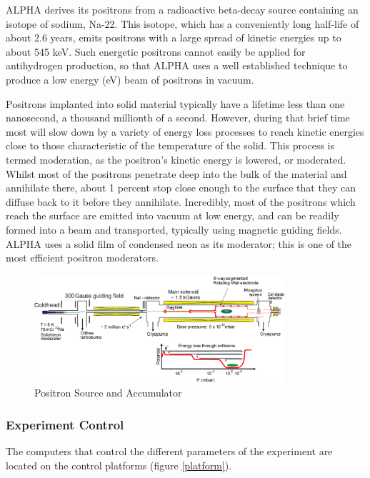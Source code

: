 \documentclass[12pt,a4paper]{article}
\begin{document}
ALPHA derives its positrons from a radioactive beta-decay source containing an isotope of sodium, Na-22. This isotope, which has a conveniently long half-life of about 2.6 years, emits positrons with a large spread of kinetic energies up to about 545 keV. Such energetic positrons cannot easily be applied for antihydrogen production, so that ALPHA uses a well established technique to produce a low energy (eV) beam of positrons in vacuum.

Positrons implanted into solid material typically have a lifetime less than one nanosecond, a thousand millionth of a second. However, during that brief time most will slow down by a variety of energy loss processes to reach kinetic energies close to those characteristic of the temperature of the solid. This process is termed moderation, as the positron’s kinetic energy is lowered, or moderated. Whilst most of the positrons penetrate deep into the bulk of the material and annihilate there, about 1 percent
 stop close enough to the surface that they can diffuse back to it before they annihilate. Incredibly, most of the positrons which reach the surface are emitted into vacuum at low energy, and can be readily formed into a beam and transported, typically using magnetic guiding fields. ALPHA uses a solid film of condensed neon as its moderator; this is one of the most efficient positron moderators.
 
 
\begin{figure}[h]
\centering
\includegraphics[width=110 mm, height=40mm]{fullsetup}
\caption{Positron Source and Accumulator}
\label{positroon}
\end{figure}

\subsubsection{Experiment Control}

The computers that control the different parameters of the experiment are located on the control platforms (figure \ref{platform}).  
\end{document}

